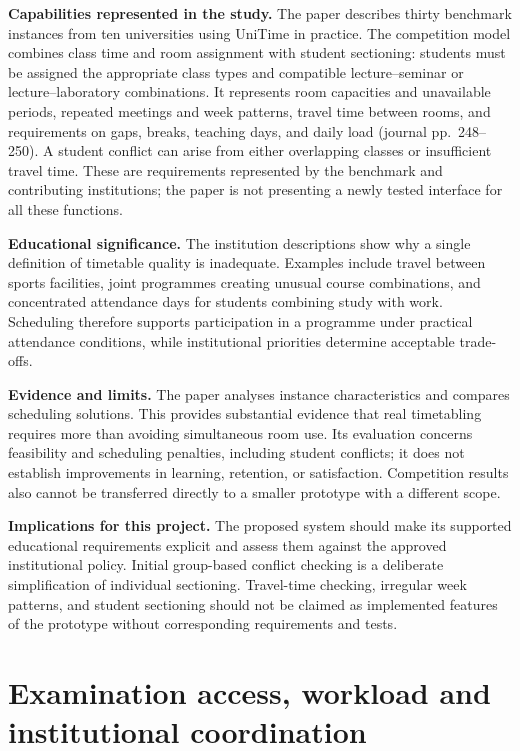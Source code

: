 \documentclass[
  11pt,a4paper,oneside]{report}
\begin{document}
\textbf{Capabilities represented in the study.} The paper describes thirty benchmark instances from ten universities using UniTime in practice. The competition model combines class time and room assignment with student sectioning: students must be assigned the appropriate class types and compatible lecture--seminar or lecture--laboratory combinations. It represents room capacities and unavailable periods, repeated meetings and week patterns, travel time between rooms, and requirements on gaps, breaks, teaching days, and daily load (journal pp.~248--250). A student conflict can arise from either overlapping classes or insufficient travel time. These are requirements represented by the benchmark and contributing institutions; the paper is not presenting a newly tested interface for all these functions.

\textbf{Educational significance.} The institution descriptions show why a single definition of timetable quality is inadequate. Examples include travel between sports facilities, joint programmes creating unusual course combinations, and concentrated attendance days for students combining study with work. Scheduling therefore supports participation in a programme under practical attendance conditions, while institutional priorities determine acceptable trade-offs.

\textbf{Evidence and limits.} The paper analyses instance characteristics and compares scheduling solutions. This provides substantial evidence that real timetabling requires more than avoiding simultaneous room use. Its evaluation concerns feasibility and scheduling penalties, including student conflicts; it does not establish improvements in learning, retention, or satisfaction. Competition results also cannot be transferred directly to a smaller prototype with a different scope.

\textbf{Implications for this project.} The proposed system should make its supported educational requirements explicit and assess them against the approved institutional policy. Initial group-based conflict checking is a deliberate simplification of individual sectioning. Travel-time checking, irregular week patterns, and student sectioning should not be claimed as implemented features of the prototype without corresponding requirements and tests.

\section{Examination access, workload and institutional coordination}
\end{document}
